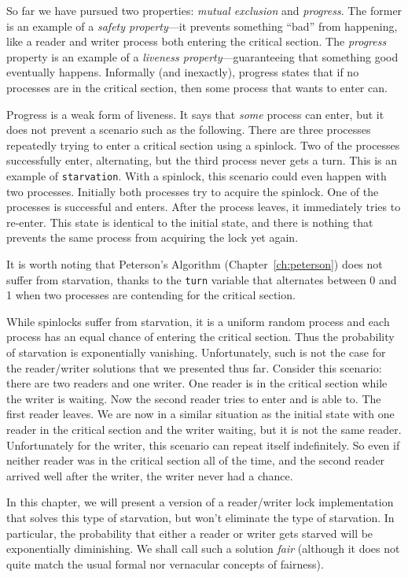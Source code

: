 \documentclass{report}
\begin{document}
So far we have pursued two properties: \emph{mutual exclusion}
and \emph{progress}.  The former is an example of a
\emph{safety property}---it prevents something ``bad'' from
happening, like a reader and writer process both entering the
critical section.  The \emph{progress} property is an example
of a \emph{liveness property}---guaranteeing that something good
eventually happens.
Informally (and inexactly), progress states that if no processes
are in the critical section, then some process that wants to enter
can.

Progress is a weak form of liveness.  It says that \emph{some}
process can enter, but it does not prevent a scenario such as
the following.  There are three processes repeatedly trying to
enter a critical section using a spinlock.  Two of
the processes successfully enter, alternating, but the third
process never gets a turn.  This is an example of
\texttt{starvation}.  With a spinlock, this scenario could
even happen with two processes.  Initially both processes
try to acquire the spinlock.  One of the processes is
successful and enters.  After the process leaves, it immediately
tries to re-enter.  This state is identical to the initial
state, and there is nothing that prevents the same process
from acquiring the lock yet again.

It is worth noting that Peterson's Algorithm (Chapter~\ref{ch:peterson})
does not suffer from starvation, thanks to the \texttt{turn} variable
that alternates between 0 and 1 when two processes are contending for
the critical section.

While spinlocks suffer from starvation, it is a uniform random
process and each process has an equal chance of entering the critical
section.  Thus the probability of starvation is exponentially vanishing.
Unfortunately, such is not the case for the
reader/writer solutions that we presented thus far.
Consider this scenario: there are two readers and one writer.  One reader
is in the critical section while the writer is waiting.  Now the
second reader tries to enter and is able to.  The first reader leaves.
We are now in a similar situation as the initial state with one reader
in the critical section and the writer waiting, but it is not the same
reader.  Unfortunately for the writer, this scenario can repeat itself
indefinitely.  So even if neither reader was in the critical section
all of the time, and the second reader arrived well after the writer,
the writer never had a chance.

In this chapter, we will present a version of a reader/writer lock
implementation that solves this type of starvation, but won't eliminate
the type of starvation.
In particular, the probability that either a reader or writer gets starved
will be exponentially diminishing.
We shall call such a solution \emph{fair} (although it does not quite
match the usual formal nor vernacular concepts of fairness).
\end{document}
